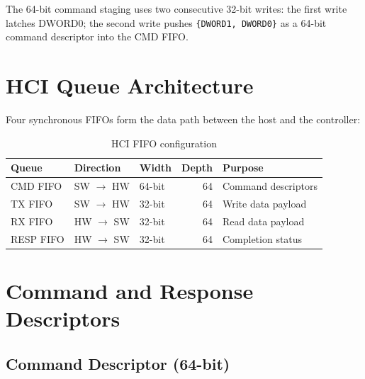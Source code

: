 \documentclass[12pt, a4paper, oneside]{report}
\begin{document}
The 64-bit command staging uses two consecutive 32-bit writes: the first write latches
DWORD0; the second write pushes \lstinline[style=plain]|{DWORD1, DWORD0}| as a 64-bit
command descriptor into the CMD FIFO.

\section{HCI Queue Architecture}

Four synchronous FIFOs form the data path between the host and the controller:

\begin{table}[H]
\centering
\caption{HCI FIFO configuration}
\label{tab:hci_fifos}
\begin{tabular}{lllrl}
\toprule
\textbf{Queue} & \textbf{Direction} & \textbf{Width} & \textbf{Depth} & \textbf{Purpose} \\
\midrule
CMD FIFO  & SW $\rightarrow$ HW & 64-bit & 64 & Command descriptors \\
TX FIFO   & SW $\rightarrow$ HW & 32-bit & 64 & Write data payload \\
RX FIFO   & HW $\rightarrow$ SW & 32-bit & 64 & Read data payload \\
RESP FIFO & HW $\rightarrow$ SW & 32-bit & 64 & Completion status \\
\bottomrule
\end{tabular}
\end{table}

\section{Command and Response Descriptors}

\subsection{Command Descriptor (64-bit)}
\end{document}
